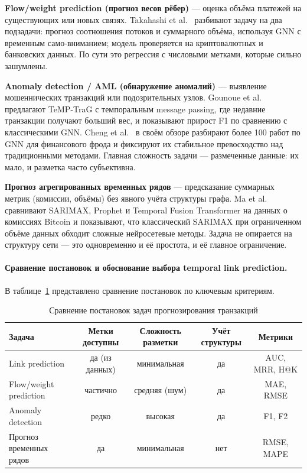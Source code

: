 \documentclass[a4paper,12pt]{extarticle}
\begin{document}
\textbf{Flow/weight prediction (прогноз весов рёбер)} --- оценка объёма платежей на существующих или новых связях. Takahashi et al.~\cite{takahashi2024flow} разбивают задачу на два подзадачи: прогноз соотношения потоков и суммарного объёма, используя GNN с временным само-вниманием; модель проверяется на криптовалютных и банковских данных. По сути это регрессия с числовыми метками, которые сильно зашумлены.

\textbf{Anomaly detection / AML (обнаружение аномалий)} --- выявление мошеннических транзакций или подозрительных узлов. Gounoue et al.~\cite{gounoue2025temptrag} предлагают TeMP-TraG с темпоральным message passing, где недавние транзакции получают больший вес, и показывают прирост F1 по сравнению с классическими GNN. Cheng et al.~\cite{cheng2024gnn} в своём обзоре разбирают более 100 работ по GNN для финансового фрода и фиксируют их стабильное превосходство над традиционными методами. Главная сложность задачи --- размеченные данные: их мало, и разметка часто субъективна.

\textbf{Прогноз агрегированных временных рядов} --- предсказание суммарных метрик (комиссии, объёмы) без явного учёта структуры графа. Ma et al.~\cite{ma2025fees} сравнивают SARIMAX, Prophet и Temporal Fusion Transformer на данных о комиссиях Bitcoin и показывают, что классический SARIMAX при ограниченном объёме данных обходит сложные нейросетевые методы. Задача не опирается на структуру сети --- это одновременно и её простота, и её главное ограничение.

\paragraph{Сравнение постановок и обоснование выбора temporal link prediction.}
В таблице~\ref{tab:task_comparison} представлено сравнение постановок по ключевым критериям.

\begin{table}[ht]
    \caption{Сравнение постановок задач прогнозирования транзакций}
    \label{tab:task_comparison}
    \footnotesize
    \centering
    \begin{tabular}{lcccc}
        \toprule
        Задача & Метки доступны & Сложность разметки & Учёт структуры & Метрики \\
        \midrule
        Link prediction          & да (из данных) & минимальная & да & AUC, MRR, H@K \\
        Flow/weight prediction   & частично       & средняя (шум) & да & MAE, RMSE \\
        Anomaly detection        & редко          & высокая       & да & F1, F2 \\
        Прогноз временных рядов  & да             & минимальная   & нет & RMSE, MAPE \\
        \bottomrule
    \end{tabular}
\end{table}
\end{document}
